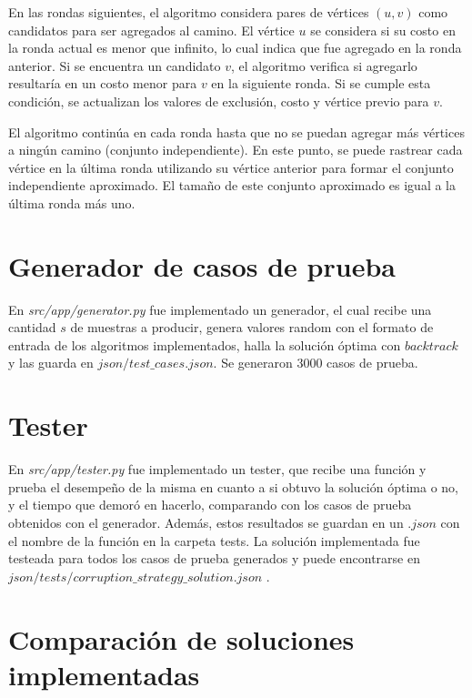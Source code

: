 \documentclass[10pt]{article} %
\begin{document}
	En las rondas siguientes, el algoritmo considera pares de vértices $(u, v)$ como candidatos para ser agregados al camino. El vértice $u$ se considera si su costo en la ronda actual es menor que infinito, lo cual indica que fue agregado en la ronda anterior. Si se encuentra un candidato $v$, el algoritmo verifica si agregarlo resultaría en un costo menor para $v$ en la siguiente ronda. Si se cumple esta condición, se actualizan los valores de exclusión, costo y vértice previo para $v$.
	
	El algoritmo continúa en cada ronda hasta que no se puedan agregar más vértices a ningún camino (conjunto independiente). En este punto, se puede rastrear cada vértice en la última ronda utilizando su vértice anterior para formar el conjunto independiente aproximado. El tamaño de este conjunto aproximado es igual a la última ronda más uno.
	
	\section{Generador de casos de prueba}
	
	En \textit{src/app/generator.py} fue implementado un generador, el cual recibe una cantidad $ s $ de muestras a producir, genera valores random con el formato de entrada de los algoritmos implementados, halla la soluci\'on \'optima con $ backtrack $ y las guarda en $ json/test\_cases.json $. Se generaron 3000 casos de prueba.
	
	\section{Tester}
	En \textit{src/app/tester.py} fue implementado un tester, que recibe una funci\'on y prueba el desempe\~no de la misma en cuanto a si obtuvo la soluci\'on \'optima o no, y el tiempo que demor\'o en hacerlo, comparando con los casos de prueba obtenidos con el generador. Adem\'as, estos resultados se guardan en un $ .json $ con el nombre de la funci\'on en la carpeta tests. La soluci\'on implementada fue testeada para todos los casos de prueba generados y puede encontrarse en $ json/tests/corruption\_strategy\_solution.json $ .
	
	\section{Comparaci\'on de soluciones implementadas}          
\end{document}
